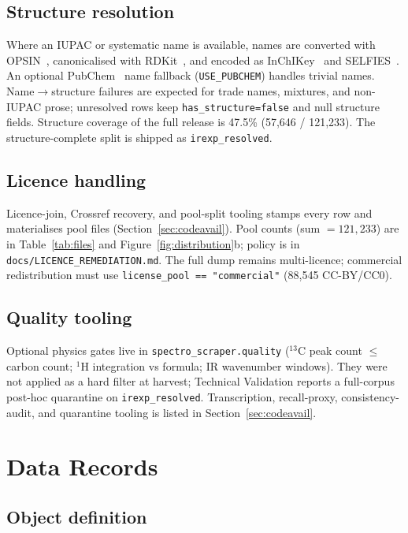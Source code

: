 \documentclass[pdflatex,sn-nature]{sn-jnl}
\begin{document}
\subsection{Structure resolution}

Where an IUPAC or systematic name is available, names are converted with
OPSIN~\citep{lowe2011opsin}, canonicalised with RDKit~\citep{landrum_rdkit}, and
encoded as InChIKey~\citep{heller2013inchi} and SELFIES~\citep{krenn2020selfies}.
An optional PubChem~\citep{kim2023pubchem} name fallback (\texttt{USE\_PUBCHEM})
handles trivial names.
Name$\to$structure failures are expected for trade names, mixtures, and
non-IUPAC prose; unresolved rows keep \texttt{has\_structure=false} and null
structure fields.
Structure coverage of the full release is 47.5\% (57,646 / 121,233).
The structure-complete split is shipped as \texttt{irexp\_resolved}.

\subsection{Licence handling}

Licence-join, Crossref recovery, and pool-split tooling stamps every row and
materialises pool files (Section~\ref{sec:codeavail}).
Pool counts (sum $= 121{,}233$) are in Table~\ref{tab:files} and
Figure~\ref{fig:distribution}b; policy is in \texttt{docs/LICENCE\_REMEDIATION.md}.
The full dump remains multi-licence; commercial redistribution must use
\texttt{license\_pool == "commercial"} (88,545 CC-BY/CC0).

\subsection{Quality tooling}

Optional physics gates live in \texttt{spectro\_scraper.quality}
($^{13}$C peak count $\leq$ carbon count; $^{1}$H integration vs formula; IR
wavenumber windows).
They were not applied as a hard filter at harvest; Technical Validation reports a
full-corpus post-hoc quarantine on \texttt{irexp\_resolved}.
Transcription, recall-proxy, consistency-audit, and quarantine tooling is listed
in Section~\ref{sec:codeavail}.

\section{Data Records}\label{sec:datarecords}

\subsection{Object definition}
\end{document}
